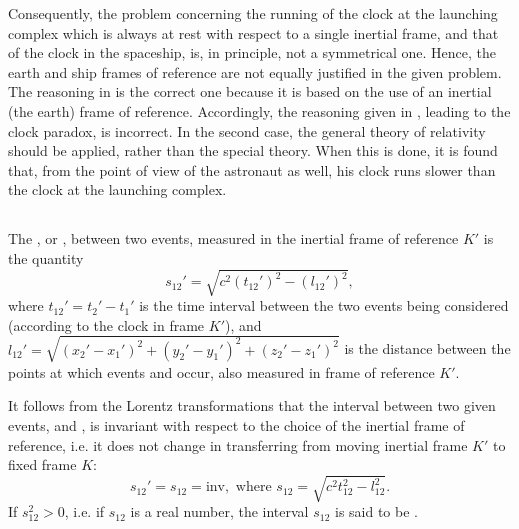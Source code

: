 Consequently, the problem concerning the running of the clock at the launching complex which is always at rest with respect to a single inertial frame, and that of the clock in the spaceship, is, in principle, not a symmetrical one. Hence, the earth and ship frames of reference are not equally justified in the given problem. The reasoning in  is the correct one because it is based on the use of an inertial (the earth) frame of reference. Accord­ingly, the reasoning given in , leading to the clock paradox, is incorrect. In the second case, the general theory of relativity should be applied, rather than the special theory. When this is done, it is found that, from the point of view of the astronaut as well, his clock runs slower than the clock at the launching complex.

\subsection{}\label{5.4.8} The , or , between two events, measured in the inertial frame of reference $K'$ is the quantity
\begin{equation*}%
s_{12}' = \sqrt{c^{2}(t_{12}')^{2}-(l_{12}')^{2}},
\end{equation*}
where $t_{12}' = t_{2}' - t_{1}'$ is the time interval between the two events being considered (according to the clock in frame $K'$), and $l_{12}'= \sqrt{(x_{2}' -x_{1}')^{2}+(y_{2}' -y_{1}')^{2}+(z_{2}' -z_{1}')^{2}}$ is the distance between the points at which events  and  occur, also measured in frame of reference $K'$.

It follows from the Lorentz transformations that the interval between two given events,  and , is invariant with respect to the choice of the inertial frame of reference, i.e. it does not change in transferring from moving inertial frame $K'$ to fixed frame $K$:
\begin{equation*}%
s_{12}' = s_{12} = \textrm{inv}, \,\,\textrm{where}\,\, s_{12} = \sqrt{c^{2}t_{12}^{2}-l_{12}^{2}}.
\end{equation*}
If $s_{12}^{2}> 0$, i.e. if $s_{12}$ is a real number, the interval $s_{12}$ is said to be .

